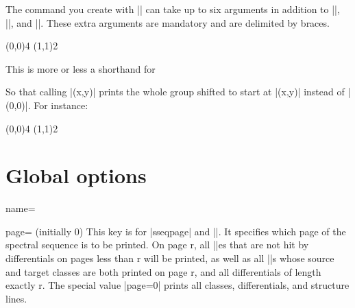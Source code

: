 \documentclass{ltxdoc}
\begin{document}
\begin{sseqdata}[name=ex1,degree={#1}{1-#1}]
\begin{command}{\sseqnewcmd\opt{*}}
The command you create with |\sseqnewcmd| can take up to six arguments in addition to |\options|, |\x|, and |\y|. These extra arguments are mandatory and are delimited by braces.
\begin{codeexample}[]
\sseqnewcmd*{}
\begin{sseqpage}
\tower[orange](0,0){4}
\tower[red](1,1){2}
\end{sseqpage}
\end{codeexample}
\end{command}

\begin{command}{\sseqnewgroup\opt{*}}
This is more or less a shorthand for
\begin{codeexample}[code only, code=white]
\sseqnewcmd\opt{*}\cscolor{(\obscurexname,\obscureyname)}
\end{codeexample}
So that calling |\mygroup(x,y)| prints the whole group shifted to start at |(x,y)| instead of |(0,0)|. For instance:
\begin{codeexample}[]
\sseqnewgroup*{}
\begin{sseqpage}
\tower[orange](0,0){4}
\tower[red](1,1){2}
\end{sseqpage}
\end{codeexample}
\end{command}

\section{Global options}
\begin{key}{name=}
\end{key}

\begin{key}{page= (initially 0)}
This key is for |sseqpage| and |\printpage|. It specifies which page of the spectral sequence is to be printed. On page r, all |\class|es that are not hit by differentials on pages less than r will be printed, as well as all |\structline|s whose source and target classes are both printed on page r, and all differentials of length exactly r. The special value |page=0| prints all classes, differentials, and structure lines.
\end{key}


\end{sseqdata}
\end{document}
